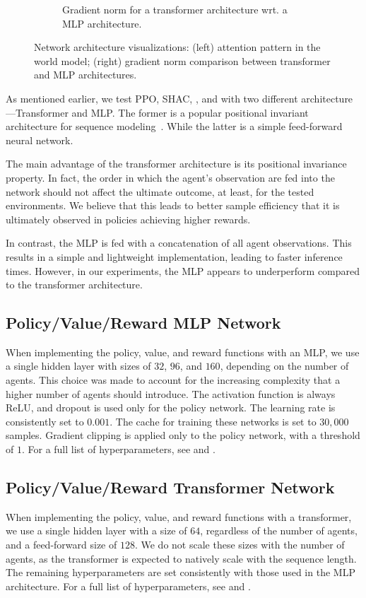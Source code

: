 \begin{figure}[t]
\begin{subfigure}[b]{0.45\textwidth}
        \caption{Gradient norm for a transformer architecture wrt. a MLP architecture.}
        \label{fig:grads-mlp}
    \end{subfigure}
    \caption{Network architecture visualizations: (left) attention pattern in the world model; (right) gradient norm comparison between transformer and MLP architectures.}
    \label{fig:combined-arch}
    \vspace{0.5cm}
\end{figure}
As mentioned earlier, we test PPO, SHAC, \fname{}, and \fnamer{} with two different architecture---Transformer and MLP. The former is a popular positional invariant architecture for sequence modeling~\cite{Vaswani17}. While the latter is a simple feed-forward neural network.

The main advantage of the transformer architecture is its positional invariance property. In fact, the order in which the agent's observation are fed into the network should not affect the ultimate outcome, at least, for the tested environments. We believe that this leads to better sample efficiency that it is ultimately observed in policies achieving higher rewards. 

In contrast, the MLP is fed with a concatenation of all agent observations. This results in a simple and lightweight implementation, leading to faster inference times. However, in our experiments, the MLP appears to underperform compared to the transformer architecture.

\subsection{Policy/Value/Reward MLP Network}
When implementing the policy, value, and reward functions with an MLP, we use a single hidden layer with sizes of $32$, $96$, and $160$, depending on the number of agents. This choice was made to account for the increasing complexity that a higher number of agents should introduce. The activation function is always ReLU, and dropout is used only for the policy network. The learning rate is consistently set to $0.001$. The cache for training these networks is set to $30,000$ samples. Gradient clipping is applied only to the policy network, with a threshold of $1$. For a full list of hyperparameters, see  and .

\subsection{Policy/Value/Reward Transformer Network}
When implementing the policy, value, and reward functions with a transformer, we use a single hidden layer with a size of $64$, regardless of the number of agents, and a feed-forward size of $128$. We do not scale these sizes with the number of agents, as the transformer is expected to natively scale with the sequence length. The remaining hyperparameters are set consistently with those used in the MLP architecture. For a full list of hyperparameters, see  and .


